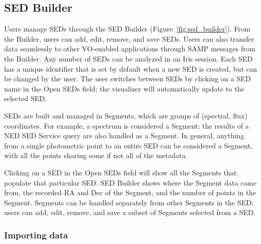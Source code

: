 \documentclass[final,5p,authoryear]{elsarticle}
\begin{document}
\subsection{SED Builder}

Users manage SEDs through the SED Builder (Figure~\ref{fig:sed_builder}). From
the Builder, users can add, edit, remove, and save SEDs. Users can also transfer
data seamlessly to other VO-enabled applications through SAMP messages from the
Builder. Any number of SEDs can be analyzed in an Iris session. Each SED has a
unique identifier that is set by default when a new SED is created, but can be
changed by the user. The user switches between SEDs by clicking on a SED name in
the Open SEDs field; the visualizer will automatically update to the selected
SED.

SEDs are built and managed in Segments, which are groups of (spectral, flux)
coordinates. For example, a spectrum is considered a Segment; the results of a
NED SED Service query are also handled as a Segment. In general, anything from a
single photometric point to an entire SED can be considered a Segment, with all the
points sharing some if not all of the metadata.

Clicking on a SED in the Open SEDs field will show all the Segments that
populate that particular SED. SED Builder shows where the Segment data came
from, the recorded RA and Dec of the Segment, and the number of points in the
Segment. Segments can be handled separately from other Segments in the SED;
users can add, edit, remove, and save a subset of Segments selected from a SED.

\subsubsection{Importing data}
\end{document}
